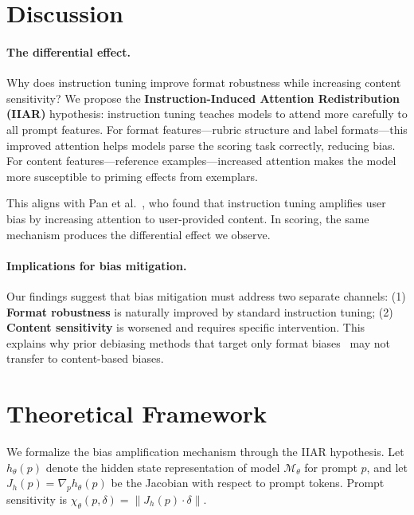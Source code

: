 \documentclass[11pt,twocolumn]{article}
\begin{document}
\section{Discussion}

\paragraph{The differential effect.}
Why does instruction tuning improve format robustness while increasing content sensitivity? We propose the \textbf{Instruction-Induced Attention Redistribution (IIAR)} hypothesis: instruction tuning teaches models to attend more carefully to all prompt features. For format features---rubric structure and label formats---this improved attention helps models parse the scoring task correctly, reducing bias. For content features---reference examples---increased attention makes the model more susceptible to priming effects from exemplars.

This aligns with Pan et al.~\cite{pan2025user}, who found that instruction tuning amplifies user bias by increasing attention to user-provided content. In scoring, the same mechanism produces the differential effect we observe.

\paragraph{Implications for bias mitigation.}
Our findings suggest that bias mitigation must address two separate channels: (1) \textbf{Format robustness} is naturally improved by standard instruction tuning; (2) \textbf{Content sensitivity} is worsened and requires specific intervention. This explains why prior debiasing methods that target only format biases~\cite{wang2023large,park2024offsetbias} may not transfer to content-based biases.

\section{Theoretical Framework}

We formalize the bias amplification mechanism through the IIAR hypothesis. Let $h_\theta(p)$ denote the hidden state representation of model $\mathcal{M}_\theta$ for prompt $p$, and let $J_h(p) = \nabla_p h_\theta(p)$ be the Jacobian with respect to prompt tokens. Prompt sensitivity is $\chi_\theta(p,\delta) = \|J_h(p) \cdot \delta\|$.
\end{document}
